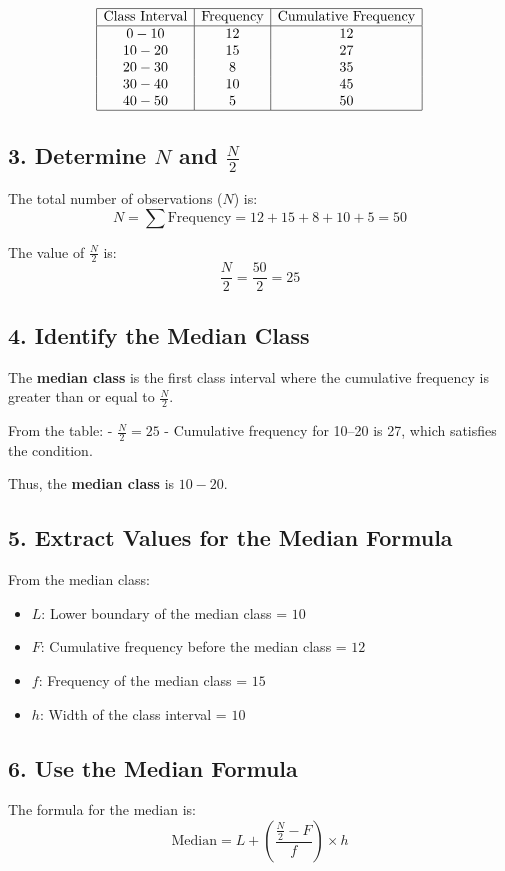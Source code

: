 \documentclass[10pt]{book}
\begin{document}
\[
\begin{array}{|c|c|c|}
\hline
\text{Class Interval} & \text{Frequency} & \text{Cumulative Frequency} \\
\hline
0-10 & 12 & 12 \\
10-20 & 15 & 27 \\
20-30 & 8 & 35 \\
30-40 & 10 & 45 \\
40-50 & 5 & 50 \\
\hline
\end{array}
\]

\subsection*{3. Determine $N$ and $\frac{N}{2}$}
The total number of observations ($N$) is:
\[
N = \sum \text{Frequency} = 12 + 15 + 8 + 10 + 5 = 50
\]

The value of $\frac{N}{2}$ is:
\[
\frac{N}{2} = \frac{50}{2} = 25
\]

\subsection*{4. Identify the Median Class}
The \textbf{median class} is the first class interval where the cumulative frequency is greater than or equal to $\frac{N}{2}$.

From the table:
- $\frac{N}{2} = 25$
- Cumulative frequency for 10–20 is 27, which satisfies the condition.

Thus, the \textbf{median class} is $10-20$.

\subsection*{5. Extract Values for the Median Formula}
From the median class:
\begin{itemize}
    \item $L$: Lower boundary of the median class = $10$
    \item $F$: Cumulative frequency before the median class = $12$
    \item $f$: Frequency of the median class = $15$
    \item $h$: Width of the class interval = $10$
\end{itemize}

\subsection*{6. Use the Median Formula}
The formula for the median is:
\[
\text{Median} = L + \left( \frac{\frac{N}{2} - F}{f} \right) \times h
\]
\end{document}
